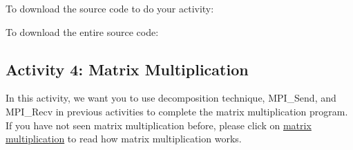 \documentclass[letterpaper,10pt,openany,oneside]{sphinxmanual}
\begin{document}
To download the source code to do your activity:

To download the entire source code:


\subsection{Activity 4: Matrix Multiplication}
\label{DecompositionAndActivity/DecompositionAndActivity:activity-4-matrix-multiplication}
In this activity, we want you to use decomposition technique, MPI\_Send, and MPI\_Recv in previous activities to complete the matrix multiplication program. If you have not seen matrix multiplication before, please click on \href{http://mathworld.wolfram.com/MatrixMultiplication.html}{matrix multiplication} to read how matrix multiplication works.
\end{document}
